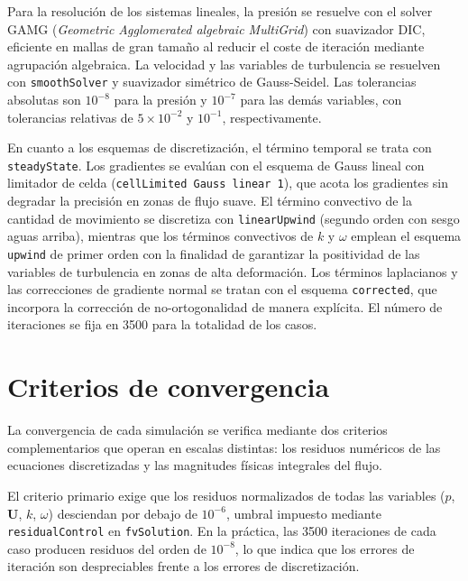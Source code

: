 Para la resolución de los sistemas lineales, la presión se resuelve con el solver GAMG (\textit{Geometric Agglomerated algebraic MultiGrid}) con suavizador DIC, eficiente en mallas de gran tamaño al reducir el coste de iteración mediante agrupación algebraica. La velocidad y las variables de turbulencia se resuelven con \texttt{smoothSolver} y suavizador simétrico de Gauss-Seidel. Las tolerancias absolutas son $10^{-8}$ para la presión y $10^{-7}$ para las demás variables, con tolerancias relativas de $5 \times 10^{-2}$ y $10^{-1}$, respectivamente.

En cuanto a los esquemas de discretización, el término temporal se trata con \texttt{steadyState}. Los gradientes se evalúan con el esquema de Gauss lineal con limitador de celda (\texttt{cellLimited Gauss linear 1}), que acota los gradientes sin degradar la precisión en zonas de flujo suave. El término convectivo de la cantidad de movimiento se discretiza con \texttt{linearUpwind} (segundo orden con sesgo aguas arriba), mientras que los términos convectivos de $k$ y $\omega$ emplean el esquema \texttt{upwind} de primer orden con la finalidad de garantizar la positividad de las variables de turbulencia en zonas de alta deformación. Los términos laplacianos y las correcciones de gradiente normal se tratan con el esquema \texttt{corrected}, que incorpora la corrección de no-ortogonalidad de manera explícita. El número de iteraciones se fija en 3500 para la totalidad de los casos.

\section{Criterios de convergencia}
\label{sec:convergence}

La convergencia de cada simulación se verifica mediante dos criterios complementarios que operan en escalas distintas: los residuos numéricos de las ecuaciones discretizadas y las magnitudes físicas integrales del flujo.

El criterio primario exige que los residuos normalizados de todas las variables ($p$, $\mathbf{U}$, $k$, $\omega$) desciendan por debajo de $10^{-6}$, umbral impuesto mediante \texttt{residualControl} en \texttt{fvSolution}. En la práctica, las 3500 iteraciones de cada caso producen residuos del orden de $10^{-8}$, lo que indica que los errores de iteración son despreciables frente a los errores de discretización.


